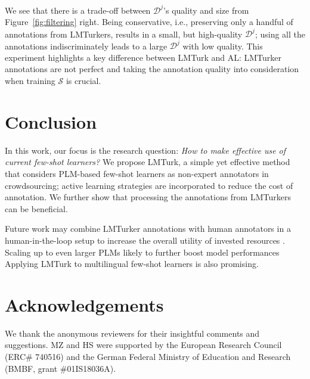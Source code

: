 \documentclass[11pt]{article}
\def\md{LMTurk\xspace}
\def\mdr{LMTurker\xspace}
\def\mdrs{LMTurkers\xspace}
\def\figref#1{Figure~\ref{fig:#1}}
\begin{document}
We see that there is a trade-off between
$\mathcal{D}^{j}$'s quality and size
from \figref{filtering} right.
Being conservative, i.e.,
preserving
only a handful of
annotations from
\mdrs, results in a small, but high-quality
$\mathcal{D}^{j}$;
using all the annotations
indiscriminately leads to a 
large $\mathcal{D}^{j}$ with low quality.
This experiment
highlights a key difference
between \md and AL:
\mdr annotations 
are not perfect and
taking the annotation quality
into consideration when training 
$\mathcal{S}$ is crucial.


\section{Conclusion}
In this work, our focus is the research
question: \emph{
  How to make effective use
  of current few-shot learners?
} We propose \md,
a simple yet effective method 
that considers PLM-based few-shot learners
as non-expert annotators in crowdsourcing;
active learning strategies are incorporated
to reduce the cost of annotation.
We further show that
processing the annotations from \mdrs
can  be beneficial.

Future work may combine
\mdr annotations with 
human annotators in a human-in-the-loop setup \cite{monarch2021human} to increase the overall utility
of invested resources \citep{bai2021pre}.
Scaling up to even larger PLMs
likely to further
boost model performances \citep{kaplan2020scaling,GPT3paper}
Applying \md to
multilingual few-shot
learners \citep{zhao-etal-2021-closer,winata2021language,lin2021few}
is also
promising.

\section*{Acknowledgements}
We thank the anonymous reviewers for their insightful comments and suggestions.
MZ and HS were supported by the European Research Council
(ERC\# 740516)
and the 
German Federal Ministry of Education and
Research (BMBF, grant \#01IS18036A).





\clearpage
\appendix

\end{document}
